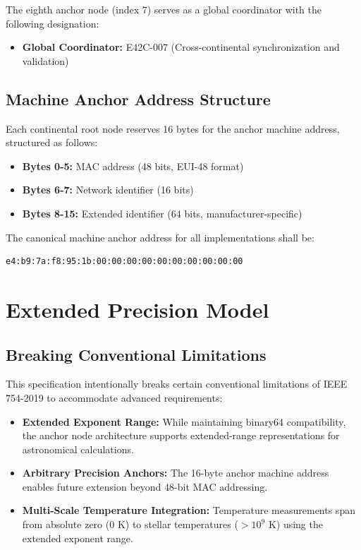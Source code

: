 \documentclass[12pt]{book}
\begin{document}
The eighth anchor node (index 7) serves as a global coordinator with the following designation:

\begin{itemize}
\item \textbf{Global Coordinator:} E42C-007 (Cross-continental synchronization and validation)
\end{itemize}

\section{Machine Anchor Address Structure}

Each continental root node reserves 16 bytes for the anchor machine address, structured as follows:

\begin{itemize}
\item \textbf{Bytes 0-5:} MAC address (48 bits, EUI-48 format)
\item \textbf{Bytes 6-7:} Network identifier (16 bits)
\item \textbf{Bytes 8-15:} Extended identifier (64 bits, manufacturer-specific)
\end{itemize}

The canonical machine anchor address for all implementations shall be:

\begin{verbatim}
e4:b9:7a:f8:95:1b:00:00:00:00:00:00:00:00:00:00
\end{verbatim}

\chapter{Extended Precision Model}

\section{Breaking Conventional Limitations}

This specification intentionally breaks certain conventional limitations of IEEE 754-2019 to accommodate advanced requirements:

\begin{itemize}
\item \textbf{Extended Exponent Range:} While maintaining binary64 compatibility, the anchor node architecture supports extended-range representations for astronomical calculations.
\item \textbf{Arbitrary Precision Anchors:} The 16-byte anchor machine address enables future extension beyond 48-bit MAC addressing.
\item \textbf{Multi-Scale Temperature Integration:} Temperature measurements span from absolute zero (0 K) to stellar temperatures ($>10^9$ K) using the extended exponent range.
\end{itemize}
\end{document}
